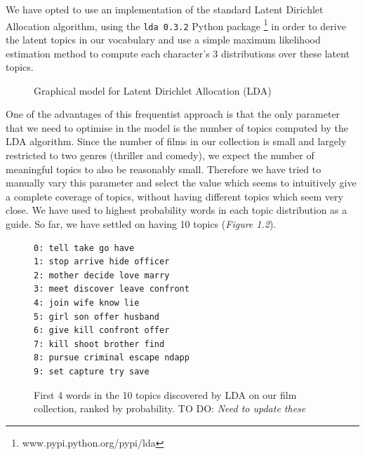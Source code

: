 \documentclass[bsc,frontabs,singlespacing,parskip, twoside]{infthesis}
\begin{document}
We have opted to use an implementation of the standard Latent Dirichlet Allocation\cite{Blei2003} algorithm, using the \texttt{lda 0.3.2} Python package \footnote{ www.pypi.python.org/pypi/lda} in order to derive the latent topics in our vocabulary and use a simple maximum likelihood estimation method to compute each character's 3 distributions over these latent topics.

\begin{figure}[h!]
\centering
{}
\caption{Graphical model for Latent Dirichlet Allocation (LDA)}
\label{fig:lda}
\end{figure}

One of the advantages of this frequentist approach is that the only parameter that we need to optimise in the model is the number of topics computed by the LDA algorithm. Since the number of films in our collection is small and largely restricted to two genres (thriller and comedy), we expect the number of meaningful topics to also be reasonably small. Therefore we have tried to manually vary this parameter and select the value which seems to intuitively give a complete coverage of topics, without having different topics which seem very close. We have used to highest probability words in each topic distribution as a guide. So far, we have settled on having 10 topics (\textit{Figure 1.2}).

\begin{figure}[h]
\centering
\begin{minipage}{8cm}
\begin{Verbatim}[frame=single]
0: tell take go have 
1: stop arrive hide officer 
2: mother decide love marry 
3: meet discover leave confront 
4: join wife know lie 
5: girl son offer husband 
6: give kill confront offer
7: kill shoot brother find 
8: pursue criminal escape ndapp
9: set capture try save 
\end{Verbatim}
\end{minipage}
\caption{First 4 words in the 10 topics discovered by LDA on our film collection, ranked by probability. TO DO: \textit{Need to update these}}
\label{topics}
\end{figure}
\end{document}
